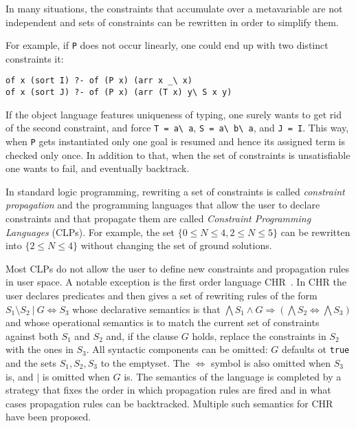 \documentclass{easychair}
\begin{document}
In many situations, the constraints that accumulate over a metavariable are
not independent and sets of constraints can be rewritten in order to simplify
them.

For example, if \verb+P+ does not occur linearly, one could end up with two
distinct constraints it:

\begin{verbatim}
of x (sort I) ?- of (P x) (arr x _\ x)
of x (sort J) ?- of (P x) (arr (T x) y\ S x y)
\end{verbatim}

If the object language features uniqueness of typing, one surely wants to
get rid of the second constraint, and force \verb+T = a\ a+,
\verb+S = a\ b\ a+, and \verb+J = I+.
This way, when \verb+P+ gets instantiated only one goal is resumed and hence
its assigned term is checked only once.  In addition to that, when the
set of constraints is unsatisfiable one wants to fail,
and eventually backtrack.

In standard logic programming, rewriting a set of constraints is called
\emph{constraint propagation} and the programming languages that allow the
user to declare constraints and that propagate them are called
\emph{Constraint Programming Languages} (CLPs).  For example, the set $\{0
	\leq N \leq 4, 2 \leq N \leq 5\}$ can be 
	rewritten into $\{2 \leq N \leq 4\}$ without changing the set of
	ground solutions.

Most CLPs do not allow the user to define new constraints and propagation
rules in user space. A notable exception is the first order language
CHR~\cite{chr}. In CHR the user declares predicates and then gives a set of
rewriting rules of the form $S_1 \setminus S_2 ~|~ G \iff S_3$ whose
declarative semantics is that $\bigwedge S_1 \wedge G \Rightarrow (\bigwedge
S_2 \iff \bigwedge S_3)$ and whose operational semantics is to match the
current set of constraints against both $S_1$ and $S_2$ and, if the clause $G$
holds, replace the constraints in $S_2$ with the ones in $S_3$. All syntactic
components can be omitted: $G$ defaults ot \verb+true+ and the sets
$S_1,S_2,S_3$ to the emptyset. The $\iff$ symbol is also omitted when $S_3$
is, and $|$ is omitted when $G$ is. The semantics of the language is completed
by a strategy that fixes the order in which propagation rules are fired and in
what cases propagation rules can be backtracked. Multiple such semantics for
CHR have been proposed.
\end{document}
